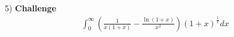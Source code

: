 \documentclass[11pt]{article}
\newcommand*\Lh{\ensuremath{\overset{\kern2pt L'H}{=}}}
\begin{document}
\pagebreak

5)
\textbf{Challenge}
\begin{align*}
\int_{0}^{\infty} {\left( \frac{1}{x(1+x)} - \frac{\ln{(1+x)}}{x^2}\right) \left(1 + x\right)^{\frac{1}{x}}dx} \\
\end{align*}
\end{document}

